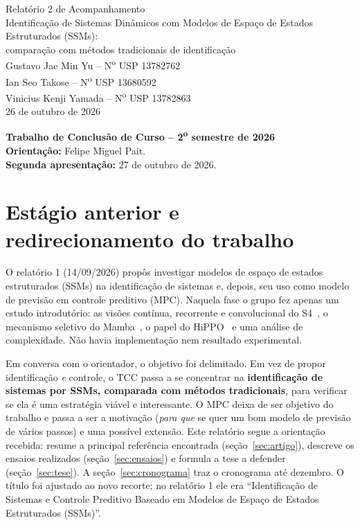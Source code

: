 \documentclass[11pt,a4paper]{article}
\begin{document}
\begin{center}
  {\LARGE Relatório 2 de Acompanhamento}\\[0.6em]
  {\large Identificação de Sistemas Dinâmicos com Modelos de Espaço de Estados Estruturados (SSMs):\\
  comparação com métodos tradicionais de identificação}\\[1.2em]
  Gustavo Jae Min Yu -- N\textsuperscript{o} USP 13782762\\
  Ian Seo Takose -- N\textsuperscript{o} USP 13680592\\
  Vinicius Kenji Yamada -- N\textsuperscript{o} USP 13782863\\[0.8em]
  26 de outubro de 2026
\end{center}

\vspace{0.8em}
\noindent\textbf{Trabalho de Conclusão de Curso -- 2\textsuperscript{o} semestre de 2026}\\
\textbf{Orientação:} Felipe Miguel Pait.\\
\textbf{Segunda apresentação:} 27 de outubro de 2026.

\section{Estágio anterior e redirecionamento do trabalho}

O relatório 1 (14/09/2026) propôs investigar modelos de espaço de estados estruturados (SSMs) na
identificação de sistemas e, depois, seu uso como modelo de previsão em controle preditivo (MPC).
Naquela fase o grupo fez apenas um estudo introdutório: as visões contínua, recorrente e
convolucional do S4~\cite{gu2022s4}, o mecanismo seletivo do Mamba~\cite{gu2023mamba}, o papel do
HiPPO~\cite{gu2020hippo} e uma análise de complexidade. Não havia implementação nem resultado
experimental.

Em conversa com o orientador, o objetivo foi delimitado. Em vez de
propor identificação \emph{e} controle, o TCC passa a se concentrar na \textbf{identificação de
sistemas por SSMs, comparada com métodos tradicionais}, para verificar se ela é uma estratégia
viável e interessante. O MPC deixa de ser objetivo do trabalho e passa a ser a motivação
(\emph{para que} se quer um bom modelo de previsão de vários passos) e uma possível extensão. Este
relatório segue a orientação recebida: resume a principal referência encontrada
(seção~\ref{sec:artigo}), descreve os ensaios realizados (seção~\ref{sec:ensaios}) e formula a tese
a defender (seção~\ref{sec:tese}). A seção~\ref{sec:cronograma} traz o cronograma até dezembro. O título foi ajustado ao novo recorte;
no relatório 1 ele era ``Identificação de Sistemas e Controle Preditivo Baseado em Modelos de Espaço
de Estados Estruturados (SSMs)''.
\end{document}
